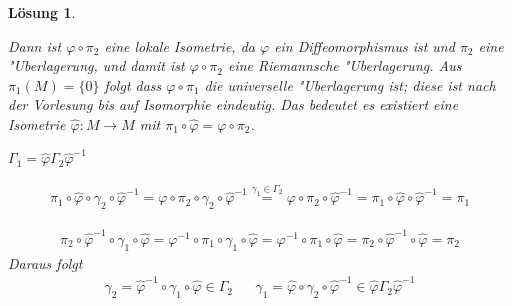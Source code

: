 \documentclass[paper=A4, twoside, chapterprefix=true, bibliography=totoc, headsepline]{scrbook}
\let\temp\phi
\let\phi\varphi
\let\varphi\temp
\let\temp\theta
\let\theta\vartheta
\let\vartheta\temp
\let\temp\epsilon
\let\epsilon\varepsilon
\let\varepsilon\temp
\let\temp\rho
\let\rho\varrho
\let\varrho\temp
\theoremstyle{plain}
\theoremstyle{nonumberplain}
\theoremstyle{empty}
\theoremstyle{break}
\newtheorem{Loes}{L\"osung}
\newcommand{\quot}[1]{\textrm{\glqq}{#1}\textrm{\grqq}}
\begin{document}
\begin{Loes}
\begin{description}[leftmargin=*]
{}
	Dann ist $\phi \circ \pi_2$ eine lokale Isometrie, da $\phi$ ein Diffeomorphismus ist und $\pi_2$ eine "Uberlagerung, und damit ist $\phi \circ \pi_2$ eine Riemannsche "Uberlagerung.
	Aus $\pi_1(M) = \{0\}$ folgt dass $\phi \circ \pi_1$ die universelle "Uberlagerung ist; diese ist nach der Vorlesung bis auf Isomorphie eindeutig.
	Das bedeutet es existiert eine Isometrie $\hat\phi: M \to M$ mit $\pi_1 \circ \hat\phi = \phi \circ \pi_2$.
	\begin{description}[leftmargin=*,font=\normalfont\itshape]
	\item[Behauptung:] $\Gamma_1 = \hat\phi \Gamma_2 \hat\phi^{-1}$
	\item[Beweis:] \begin{description}[leftmargin=*,font=\normalfont]
		\item[\quot{$\subseteq$}:]
			\begin{align*}
				\pi_1 \circ \hat\phi \circ \gamma_2 \circ \hat\phi^{-1} = \phi \circ \pi_2 \circ \gamma_2 \circ \hat\phi^{-1} \overset{\gamma_1 \in \Gamma_2}{=} \phi \circ \pi_2 \circ \hat\phi^{-1} = \pi_1 \circ \hat\phi \circ \hat\phi^{-1} = \pi_1
			\end{align*}
		\item[\quot{$\supseteq$}:]
			\begin{align*}
				\pi_2 \circ \hat\phi^{-1} \circ \gamma_1 \circ \hat\phi = \phi^{-1} \circ \pi_1 \circ \gamma_1 \circ \hat\phi = \phi^{-1} \circ \pi_1 \circ \hat\phi = \pi_2 \circ \hat\phi^{-1} \circ \hat\phi = \pi_2
			\end{align*}
			Daraus folgt
			\begin{align*}
				\gamma_2 = \hat\phi^{-1} \circ \gamma_1 \circ \hat\phi \in \Gamma_2 && \gamma_1 = \hat\phi \circ \gamma_2 \circ \hat\phi^{-1} \in \hat\phi \Gamma_2 \hat\phi^{-1}
			\end{align*}
		\end{description}
	\end{description}
\end{description}\end{Loes}

\printindex

\printglossary[title=Glossar] %



\end{document}
